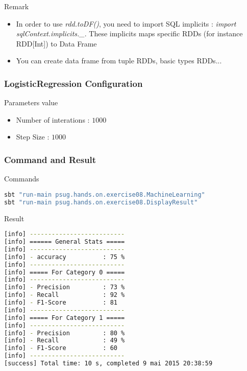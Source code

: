 \documentclass[slidetop,9pt,utf8]{beamer}
\begin{document}
\begin{CJK}{UTF8}{gbsn}
\begin{frame}
  \begin{block}{Remark}
    \begin{itemize}
      \item In order to use \textit{rdd.toDF()}, you need to import SQL implicits : \textit{import sqlContext.implicits.\_}. These implicits maps specific RDDs (for instance RDD[Int]) to Data Frame
      \item You can create data frame from tuple RDDs, basic types RDDs...
    \end{itemize}
  \end{block}

\end{frame}

\begin{frame}
  \frametitle{LogisticRegression Configuration}

  \begin{block}{Parameters value}
    \begin{itemize}
      \item Number of interations : $1000$
      \item Step Size : $1000$
    \end{itemize}
  \end{block}

\end{frame}

\begin{frame}[fragile]
  \frametitle{Command and Result}

  \begin{block}{Commands}
    \begin{lstlisting}[language=bash, style=terminal]
sbt "run-main psug.hands.on.exercise08.MachineLearning"
sbt "run-main psug.hands.on.exercise08.DisplayResult"    
    \end{lstlisting}
  \end{block}

  \begin{block}{Result}
    \begin{lstlisting}[language=bash, style=terminal]
[info] --------------------------
[info] ====== General Stats =====
[info] --------------------------
[info] - accuracy          : 75 %
[info] --------------------------
[info] ===== For Category 0 =====
[info] --------------------------
[info] - Precision         : 73 %
[info] - Recall            : 92 %
[info] - F1-Score          : 81
[info] --------------------------
[info] ===== For Category 1 =====
[info] --------------------------
[info] - Precision         : 80 %
[info] - Recall            : 49 %
[info] - F1-Score          : 60
[info] --------------------------
[success] Total time: 10 s, completed 9 mai 2015 20:38:59
    \end{lstlisting}
  \end{block}

\end{frame}


\end{CJK}
\end{document}
